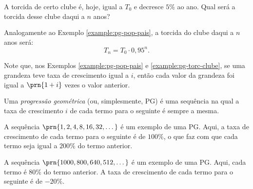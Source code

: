 \begin{example}
\label{example:pg-torc-clube}
A torcida de certo clube é, hoje, igual a $T_0$ e decresce $5\%$ ao ano. Qual será a torcida desse clube daqui a $n$ anos?
\end{example}

\begin{solution}
Analogamente ao Exemplo \ref{example:pg-pop-pais}, a torcida do clube daqui a $n$ anos será:
%
\begin{equation*}
T_n = T_0 \cdot 0{,}95^n.
\end{equation*}
\end{solution}

\begin{remark}
Note que, nos Exemplos \ref{example:pg-pop-pais} e \ref{example:pg-torc-clube}, se uma grandeza teve taxa de crescimento igual a $i$, então cada valor da grandeza foi igual a $\prn{1+i}$ vezes o valor anterior.
\end{remark}

\begin{definition}
Uma \emph{progressão geométrica} (ou, simplesmente, PG) é uma sequência na qual a taxa de crescimento $i$ de cada termo para o seguinte é sempre a mesma.
\end{definition}

\begin{example}
A sequência $\prn{1, 2, 4, 8, 16, 32, \dots }$ é um exemplo de uma PG. Aqui, a taxa de crescimento de cada termo para o seguinte é de $100 \% $, o que faz com que cada termo seja igual a $200 \% $ do termo anterior.
\end{example}

\begin{example}
A sequência $\prn{1000, 800, 640, 512 , \dots }$ é um exemplo de uma PG. Aqui, cada termo é $80 \% $ do termo anterior. A taxa de crescimento de cada termo para o seguinte é de $ -20 \% $.
\end{example}